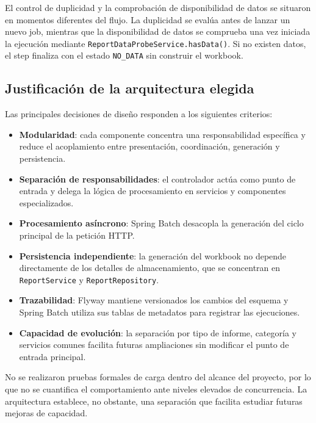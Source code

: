 \documentclass[11pt,a4paper,titlepage,oneside]{report}
\begin{document}
El control de duplicidad y la comprobación de disponibilidad de datos se
situaron en momentos diferentes del flujo. La duplicidad se evalúa antes de
lanzar un nuevo job, mientras que la disponibilidad de datos se comprueba una
vez iniciada la ejecución mediante \texttt{ReportDataProbeService.hasData()}.
Si no existen datos, el step finaliza con el estado \texttt{NO\_DATA} sin
construir el workbook.

\subsection{Justificación de la arquitectura elegida}

Las principales decisiones de diseño responden a los siguientes criterios:

\begin{itemize}

  \item \textbf{Modularidad}: cada componente concentra una responsabilidad
  específica y reduce el acoplamiento entre presentación, coordinación,
  generación y persistencia.

  \item \textbf{Separación de responsabilidades}: el controlador actúa como
  punto de entrada y delega la lógica de procesamiento en servicios y
  componentes especializados.

  \item \textbf{Procesamiento asíncrono}: Spring Batch desacopla la generación
  del ciclo principal de la petición HTTP.

  \item \textbf{Persistencia independiente}: la generación del workbook no
  depende directamente de los detalles de almacenamiento, que se concentran en
  \texttt{ReportService} y \texttt{ReportRepository}.

  \item \textbf{Trazabilidad}: Flyway mantiene versionados los cambios del
  esquema y Spring Batch utiliza sus tablas de metadatos para registrar las
  ejecuciones.

  \item \textbf{Capacidad de evolución}: la separación por tipo de informe,
  categoría y servicios comunes facilita futuras ampliaciones sin modificar el
  punto de entrada principal.

\end{itemize}

No se realizaron pruebas formales de carga dentro del alcance del proyecto, por
lo que no se cuantifica el comportamiento ante niveles elevados de
concurrencia. La arquitectura establece, no obstante, una separación que
facilita estudiar futuras mejoras de capacidad.
\end{document}
